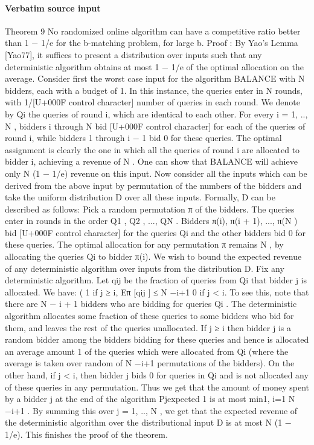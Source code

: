 \documentclass[10pt]{article}
\begin{document}
\paragraph{Verbatim source input}
\begin{ReviewVerbatim}
Theorem 9 No randomized online algorithm can have a competitive ratio better than 1 − 1/e
for the b-matching problem, for large b.
Proof : By Yao’s Lemma [Yao77], it suffices to present a distribution over inputs such that
any deterministic algorithm obtains at most 1 − 1/e of the optimal allocation on the average.
Consider first the worst case input for the algorithm BALANCE with N bidders, each with
a budget of 1. In this instance, the queries enter in N rounds, with 1/[U+000F control character] number of queries in
each round. We denote by Qi the queries of round i, which are identical to each other. For
every i = 1, .., N , bidders i through N bid [U+000F control character] for each of the queries of round i, while bidders 1
through i − 1 bid 0 for these queries. The optimal assignment is clearly the one in which all
the queries of round i are allocated to bidder i, achieving a revenue of N . One can show that
BALANCE will achieve only N (1 − 1/e) revenue on this input.
Now consider all the inputs which can be derived from the above input by permutation of the
numbers of the bidders and take the uniform distribution D over all these inputs. Formally, D
can be described as follows: Pick a random permutation π of the bidders. The queries enter
in rounds in the order Q1 , Q2 , ..., QN . Bidders π(i), π(i + 1), ..., π(N ) bid [U+000F control character] for the queries Qi
and the other bidders bid 0 for these queries. The optimal allocation for any permutation
π remains N , by allocating the queries Qi to bidder π(i). We wish to bound the expected
revenue of any deterministic algorithm over inputs from the distribution D.
Fix any deterministic algorithm. Let qij be the fraction of queries from Qi that bidder j is
allocated. We have:
(
1
if j ≥ i,
Eπ [qij ] ≤ N −i+1
0
if j < i.
To see this, note that there are N − i + 1 bidders who are bidding for queries Qi . The
deterministic algorithm allocates some fraction of these queries to some bidders who bid for
them, and leaves the rest of the queries unallocated. If j ≥ i then bidder j is a random
bidder among the bidders bidding for these queries and hence is allocated an average amount
1
of the queries which were allocated from Qi (where the average is taken over random
of N −i+1
permutations of the bidders). On the other hand, if j < i, then bidder j bids 0 for queries in
Qi and is not allocated any of these queries in any permutation.
Thus we get that the
amount of money spent by a bidder j at the end of the algorithm
Pjexpected
1
is at most min{1, i=1 N −i+1 }. By summing this over j = 1, .., N , we get that the expected
revenue of the deterministic algorithm over the distributional input D is at most N (1 − 1/e).
This finishes the proof of the theorem.
\end{ReviewVerbatim}
\end{document}
